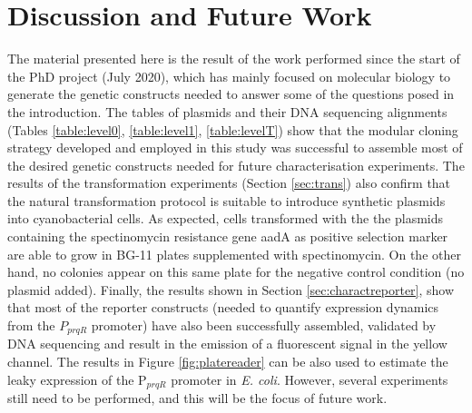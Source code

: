 \section{Discussion and Future Work}
The material presented here is the result of the work performed since the start of the PhD project (July 2020), which has mainly focused on molecular biology to generate the genetic constructs needed to answer some of the questions posed in the introduction. 
The tables of plasmids and their DNA sequencing alignments (Tables \ref{table:level0}, \ref{table:level1}, \ref{table:levelT}) show that the modular cloning strategy developed and employed in this study was successful to assemble most of the desired genetic constructs needed for future characterisation experiments. 
The results of the transformation experiments (Section \ref{sec:trans}) also confirm that the natural transformation protocol is suitable to introduce synthetic plasmids into cyanobacterial cells. As expected, cells transformed with the the plasmids containing the spectinomycin resistance gene aadA as positive selection marker are able to grow in BG-11 plates supplemented with spectinomycin. On the other hand, no colonies appear on this same plate for the negative control condition (no plasmid added). 
Finally, the results shown in Section \ref{sec:charactreporter}, show that most of the reporter constructs (needed to quantify expression dynamics from the $P_{prqR}$ promoter) have also been successfully assembled, validated by DNA sequencing and result in the emission of a fluorescent signal in the yellow channel. The results in Figure \ref{fig:platereader} can be also used to estimate the leaky expression of the P$_{prqR}$ promoter in \textit{E. coli}. 
However, several experiments still need to be performed, and this will be the focus of future work.


